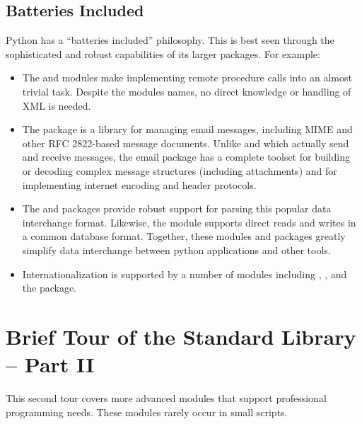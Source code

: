 \documentclass{manual}
\begin{document}
\section{Batteries Included\label{batteries-included}}

Python has a ``batteries included'' philosophy.  This is best seen
through the sophisticated and robust capabilities of its larger
packages. For example:

\begin{itemize}
\item The  and
  modules make implementing remote procedure calls into an almost trivial task.
  Despite the modules names, no direct knowledge or handling of XML is needed.
\item The  package is a library
  for managing email messages, including MIME and other RFC 2822-based message
  documents. Unlike  and  which actually send
  and receive messages, the email package has a complete toolset for building
  or decoding complex message structures (including attachments) and for
  implementing internet encoding and header protocols.
\item The  and
   packages provide robust
  support for parsing this popular data interchange format. Likewise, the
   module supports direct reads and
  writes in a common database format. Together, these modules and packages
  greatly simplify data interchange between python applications and other
  tools.
\item Internationalization is supported by a number of modules including
  ,
  , and the
   package.
\end{itemize}

\chapter{Brief Tour of the Standard Library -- Part II\label{briefTourTwo}}

This second tour covers more advanced modules that support professional
programming needs.  These modules rarely occur in small scripts.
\end{document}
